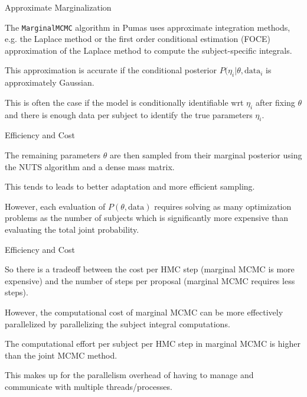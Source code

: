 \begin{frame}{Approximate Marginalization}
	\begin{vfilleditems}
		\item The \lstinline{MarginalMCMC} algorithm in Pumas uses approximate integration methods, e.g. the Laplace method or the first order conditional estimation (FOCE) approximation of the Laplace method to compute the subject-specific integrals.
		\item This approximation is accurate if the conditional posterior $P(\eta_i | \theta, \text{data}_i$ is approximately Gaussian.
		\item This is often the case if the model is conditionally identifiable wrt $\eta_i$ after fixing $\theta$ and there is enough data per subject to identify the true parameters $\eta_i$.
	\end{vfilleditems}
\end{frame}

\begin{frame}{Efficiency and Cost}
	\begin{vfilleditems}
		\item The remaining parameters $\theta$ are then sampled from their marginal posterior using the NUTS algorithm and a dense mass matrix.
		\item This tends to leads to better adaptation and more efficient sampling.
		\item However, each evaluation of $P(\theta, \text{data})$ requires solving as many optimization problems as the number of subjects which is significantly more expensive than evaluating the total joint probability.
	\end{vfilleditems}
\end{frame}

\begin{frame}{Efficiency and Cost}
	\begin{vfilleditems}
		\item So there is a tradeoff between the cost per HMC step (marginal MCMC is more expensive) and the number of steps per proposal (marginal MCMC requires less steps).
		\item However, the computational cost of marginal MCMC can be more effectively parallelized by parallelizing the subject integral computations.
		\item The computational effort per subject per HMC step in marginal MCMC is higher than the joint MCMC method.
		\item This makes up for the parallelism overhead of having to manage and communicate with multiple threads/processes.
	\end{vfilleditems}
\end{frame}

